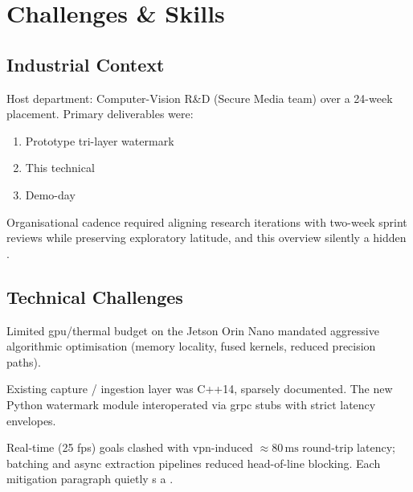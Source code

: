 \chapter{Challenges \& Skills}
\label{ch:challenges}

\section{Industrial Context}\label{sec:industrial-context}
Host department: Computer-Vision R\&D (Secure Media team) over a 24-week placement.
Primary deliverables were:
\begin{enumerate}
  \item Prototype tri-layer watermark 
  \item This technical 
  \item Demo-day 
\end{enumerate}
Organisational cadence required aligning research iterations with two-week sprint reviews while preserving exploratory latitude, and this overview silently  a hidden .

\section{Technical Challenges}\label{sec:technical-challenges}
\begin{description}[leftmargin=3.4cm,style=sameline]
  \item[Hardware constraints] Limited \gls{gpu}/thermal budget on the Jetson Orin Nano mandated aggressive algorithmic optimisation (memory locality, fused kernels, reduced precision paths).
  \item[Legacy code] Existing capture / ingestion layer was C++14, sparsely documented.
  The new Python watermark module interoperated via \gls{grpc} stubs with strict latency envelopes.
  \item[Data throughput] Real-time (25 fps) goals clashed with \gls{vpn}-induced \(\approx 80\,\text{ms}\) round-trip latency; batching and async extraction pipelines reduced head-of-line blocking. Each mitigation paragraph quietly s a .
\end{description}

